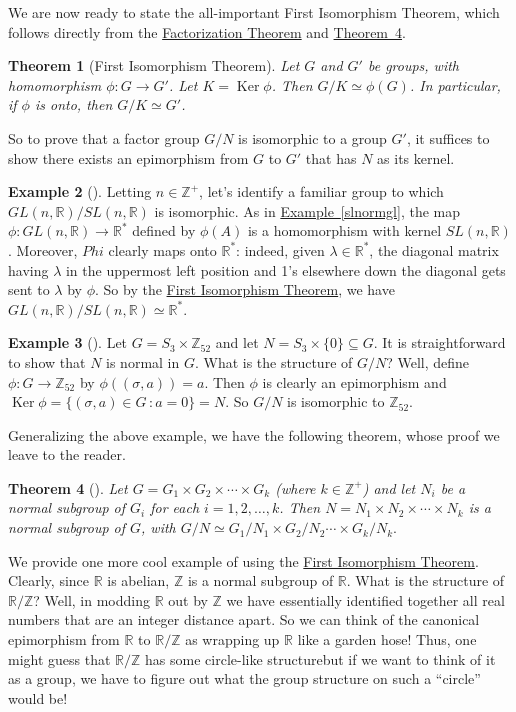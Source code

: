 \documentclass[10pt,openany,oneside]{book}
\theoremstyle{plain}
\newtheorem{theorem}{Theorem}[section]
\theoremstyle{definition}
\theoremstyle{definition}
\theoremstyle{definition}
\newtheorem{example}[theorem]{Example}
\theoremstyle{definition}
\numberwithin{equation}{section}
\def\Z{\mathbb{Z}}
\def\R{\mathbb{R}}
\DeclareMathOperator{\Ker}{Ker}
\begin{document}
We are now ready to state the all-important First Isomorphism Theorem, which follows directly from the \hyperref[facthm]{Factorization Theorem}  and \hyperref[epimono]{Theorem~4}.%
\begin{theorem}[{First Isomorphism Theorem}]\label{fit}
Let \(G\) and \(G'\) be groups, with homomorphism \(\phi:G \rightarrow G'\). Let \(K=\Ker
\phi\). Then \(G/K \simeq \phi(G)\). In particular, if \(\phi\) is onto, then \(G/K\simeq G'\).%
\end{theorem}
So to prove that a factor group \(G/N\) is isomorphic to a group \(G'\), it suffices to show there exists an epimorphism from \(G\) to \(G'\) that has \(N\) as its kernel.%
\begin{example}[]\label{example-84}
Letting \(n\in \Z^+\), let's identify a familiar group to which \(GL(n,\R)/SL(n,\R)\) is isomorphic. As in \hyperref[slnormgl]{Example~\ref{slnormgl}}, the map \(\phi:GL(n,\R)\to \R^*\) defined by \(\phi(A)\) is a homomorphism with kernel \(SL(n,\R)\). Moreover, \(Phi\) clearly maps onto \(\R^*\): indeed, given \(\lambda \in
\R^*\), the diagonal matrix having \(\lambda\) in the uppermost left position and 1's elsewhere down the diagonal gets sent to \(\lambda\) by \(\phi\). So by the \hyperref[fit]{First Isomorphism Theorem}, we have \(GL(n,\R)/SL(n,\R) \simeq \R^*\).%
\end{example}
\begin{example}[]\label{example-85}
Let \(G=S_3\times \Z_{52}\) and let \(N=S_3 \times
\{0\}\subseteq G\). It is straightforward to show that \(N\) is normal in \(G\). What is the structure of \(G/N\)? Well, define \(\phi:G\to
\Z_{52}\) by \(\phi((\sigma, a))=a\). Then \(\phi\) is clearly an epimorphism and \(\Ker \phi=\{(\sigma,a)\in G\,:a=0\}=N\). So \(G/N\) is isomorphic to \(\Z_{52}\).%
\end{example}
Generalizing the above example, we have the following theorem, whose proof we leave to the reader.%
\begin{theorem}[{}]\label{theorem-65}
Let \(G=G_1\times G_2 \times \cdots \times G_k\) (where \(k\in \Z^+\)) and let \(N_i\) be a normal subgroup of \(G_i\) for each \(i=1,2,\ldots, k\). Then \(N=N_1 \times N_2 \times \cdots \times N_k\) is a normal subgroup of \(G\), with \(G/N \simeq G_1/N_1 \times G_2/N_2
\cdots \times G_k/N_k.\)%
\end{theorem}
We provide one more cool example of using the \hyperref[fit]{First Isomorphism Theorem}. Clearly, since \(\R\) is abelian, \(\Z\) is a normal subgroup of \(\R\). What is the structure of \(\R/\Z\)? Well, in modding \(\R\) out by \(\Z\) we have essentially identified together all real numbers that are an integer distance apart. So we can think of the canonical epimorphism from \(\R\) to \(\R/\Z\) as wrapping up \(\R\) like a garden hose! Thus, one might guess that \(\R/\Z\) has some circle-like structure\textemdash{}but if we want to think of it as a group, we have to figure out what the group structure on such a ``circle'' would be!%
\end{document}
